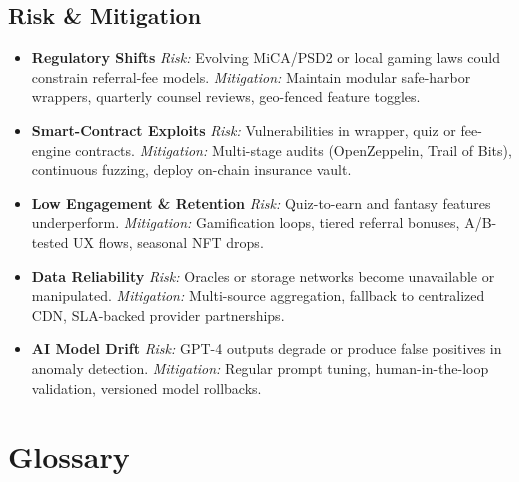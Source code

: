 \documentclass[13pt]{extarticle}
\begin{document}
\subsection{Risk \& Mitigation}
\begin{itemize}[leftmargin=2em]
  \item \textbf{Regulatory Shifts}  
    \emph{Risk:} Evolving MiCA/PSD2 or local gaming laws could constrain referral-fee models.  
    \emph{Mitigation:} Maintain modular safe-harbor wrappers, quarterly counsel reviews, geo-fenced feature toggles.

  \item \textbf{Smart-Contract Exploits}  
    \emph{Risk:} Vulnerabilities in wrapper, quiz or fee-engine contracts.  
    \emph{Mitigation:} Multi-stage audits (OpenZeppelin, Trail of Bits), continuous fuzzing, deploy on-chain insurance vault.

  \item \textbf{Low Engagement \& Retention}  
    \emph{Risk:} Quiz-to-earn and fantasy features underperform.  
    \emph{Mitigation:} Gamification loops, tiered referral bonuses, A/B-tested UX flows, seasonal NFT drops.

  \item \textbf{Data Reliability}  
    \emph{Risk:} Oracles or storage networks become unavailable or manipulated.  
    \emph{Mitigation:} Multi-source aggregation, fallback to centralized CDN, SLA-backed provider partnerships.

  \item \textbf{AI Model Drift}  
    \emph{Risk:} GPT-4 outputs degrade or produce false positives in anomaly detection.  
    \emph{Mitigation:} Regular prompt tuning, human-in-the-loop validation, versioned model rollbacks.
\end{itemize}


\newpage
\newpage
\section*{Glossary}
\end{document}
